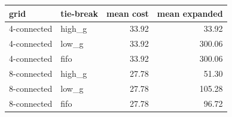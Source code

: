 \begin{tabular}{llrr}
\toprule
grid & tie-break & mean cost & mean expanded \\
\midrule
4-connected & high\_g & 33.92 & 33.92 \\
4-connected & low\_g & 33.92 & 300.06 \\
4-connected & fifo & 33.92 & 300.06 \\
8-connected & high\_g & 27.78 & 51.30 \\
8-connected & low\_g & 27.78 & 105.28 \\
8-connected & fifo & 27.78 & 96.72 \\
\bottomrule
\end{tabular}
